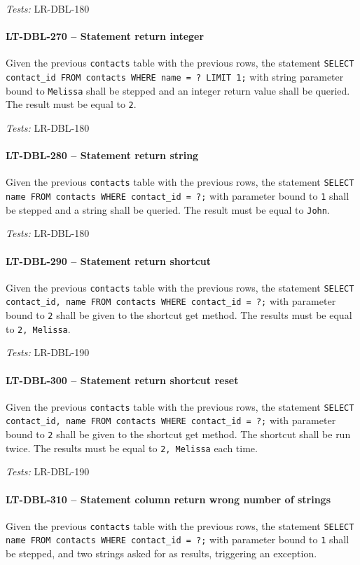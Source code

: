 \textit{Tests: } LR-DBL-180

\paragraph{LT-DBL-270 -- Statement return integer}
Given the previous \lstinline{contacts} table with the previous rows,
the statement
\lstinline{SELECT contact_id FROM contacts WHERE name = ? LIMIT 1;}
with string parameter bound to \lstinline{Melissa} shall be stepped
and an integer return value shall be queried. The result must be
equal to \lstinline{2}.

\textit{Tests: } LR-DBL-180

\paragraph{LT-DBL-280 -- Statement return string}
Given the previous \lstinline{contacts} table with the previous rows,
the statement
\lstinline{SELECT name FROM contacts WHERE contact_id = ?;}
with parameter bound to \lstinline{1} shall be stepped and
a string shall be queried. The result must be equal to \lstinline{John}.

\textit{Tests: } LR-DBL-180

\paragraph{LT-DBL-290 -- Statement return shortcut}
Given the previous \lstinline{contacts} table with the previous rows,
the statement
\lstinline{SELECT contact_id, name FROM contacts WHERE contact_id = ?;}
with parameter bound to \lstinline{2} shall be given to the
shortcut get method. The results must be equal to \lstinline{2, Melissa}.

\textit{Tests: } LR-DBL-190

\paragraph{LT-DBL-300 -- Statement return shortcut reset}
Given the previous \lstinline{contacts} table with the previous rows,
the statement
\lstinline{SELECT contact_id, name FROM contacts WHERE contact_id = ?;}
with parameter bound to \lstinline{2} shall be given to the
shortcut get method. The shortcut shall be run twice.
The results must be equal to \lstinline{2, Melissa} each time.

\textit{Tests: } LR-DBL-190

\paragraph{LT-DBL-310 -- Statement column return wrong number of strings}
Given the previous \lstinline{contacts} table with the previous rows,
the statement
\lstinline{SELECT name FROM contacts WHERE contact_id = ?;}
with parameter bound to \lstinline{1} shall be stepped,
and two strings asked for as results, triggering an exception.

